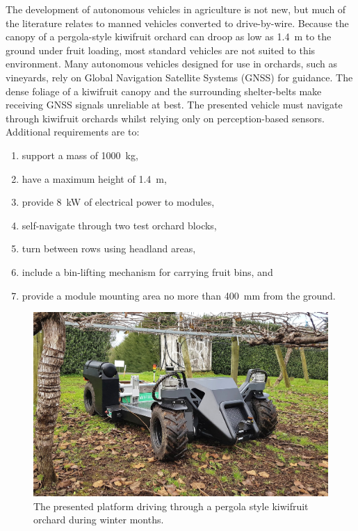 \documentclass[preprint,authoryear,12pt]{elsarticle}
\begin{document}
    The development of autonomous vehicles in agriculture is not new, but much of the literature relates to manned vehicles converted to drive-by-wire.
    Because the canopy of a pergola-style kiwifruit orchard can droop as low as \SI{1.4}{\meter} to the ground under fruit loading, most standard vehicles are not suited to this environment.
    Many autonomous vehicles designed for use in orchards, such as vineyards, rely on Global Navigation Satellite Systems (GNSS) for guidance.
    The dense foliage of a kiwifruit canopy and the surrounding shelter-belts make receiving GNSS signals unreliable at best.
    The presented vehicle must navigate through kiwifruit orchards whilst relying only on perception-based sensors.
    Additional requirements are to:
    \begin{enumerate}
        \item support a mass of \SI{1000}{\kilo\gram},
        \item have a maximum height of \SI{1.4}{\meter},
        \item provide \SI{8}{\kilo\watt} of electrical power to modules,
        \item self-navigate through two test orchard blocks,
        \item turn between rows using headland areas,
        \item include a bin-lifting mechanism for carrying fruit bins, and
        \item provide a module mounting area no more than \SI{400}{\milli\meter} from the ground.
    \end{enumerate}
    \begin{figure}[htb]
        \centering
        \includegraphics[width=\linewidth]{imgs/photos/suzy_general.jpg}
        \caption{
            The presented platform driving through a pergola style kiwifruit orchard during winter months.
        }
        \label{fig:suzy}
    \end{figure}
\end{document}
